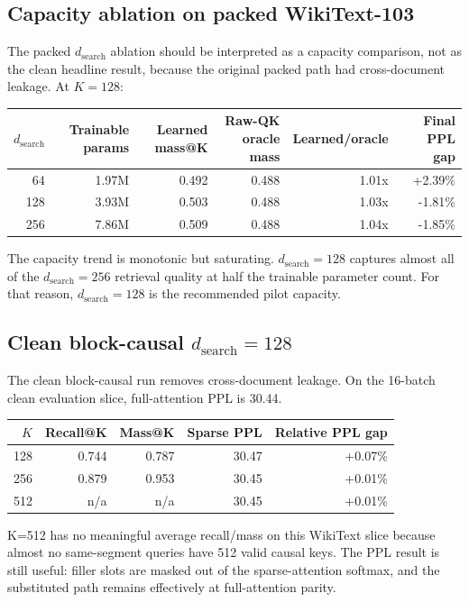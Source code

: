 \documentclass[10pt]{article}
\begin{document}
\subsection{Capacity ablation on packed WikiText-103}
The packed $d_{\mathrm{search}}$ ablation should be interpreted as a capacity
comparison, not as the clean headline result, because the original packed path
had cross-document leakage. At $K=128$:
\begin{table}[h]
\centering
\begin{tabular}{rrrrrr}
\toprule
$d_{\mathrm{search}}$ & Trainable params & Learned mass@K & Raw-QK oracle mass & Learned/oracle & Final PPL gap\\
\midrule
64 & 1.97M & 0.492 & 0.488 & 1.01x & +2.39\%\\
128 & 3.93M & 0.503 & 0.488 & 1.03x & -1.81\%\\
256 & 7.86M & 0.509 & 0.488 & 1.04x & -1.85\%\\
\bottomrule
\end{tabular}
\end{table}
The capacity trend is monotonic but saturating. $d_{\mathrm{search}}=128$
captures almost all of the $d_{\mathrm{search}}=256$ retrieval quality at half
the trainable parameter count. For that reason, $d_{\mathrm{search}}=128$ is
the recommended pilot capacity.

\subsection{Clean block-causal \texorpdfstring{$d_{\mathrm{search}}=128$}{dsearch=128}}
The clean block-causal run removes cross-document leakage. On the 16-batch clean
evaluation slice, full-attention PPL is 30.44.
\begin{table}[h]
\centering
\begin{tabular}{rrrrr}
\toprule
$K$ & Recall@K & Mass@K & Sparse PPL & Relative PPL gap\\
\midrule
128 & 0.744 & 0.787 & 30.47 & +0.07\%\\
256 & 0.879 & 0.953 & 30.45 & +0.01\%\\
512 & n/a & n/a & 30.45 & +0.01\%\\
\bottomrule
\end{tabular}
\end{table}
K=512 has no meaningful average recall/mass on this WikiText slice because
almost no same-segment queries have 512 valid causal keys. The PPL result is
still useful: filler slots are masked out of the sparse-attention softmax, and
the substituted path remains effectively at full-attention parity.
\end{document}
